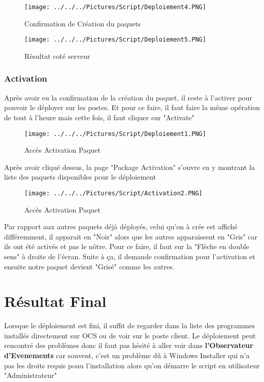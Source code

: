 \documentclass[11pt,a4paper,oneside]{article}
\begin{document}
\begin{figure}[hbtp]
\centering
\texttt{[image: ../../../Pictures/Script/Deploiement4.PNG]}
\caption{Confirmation de Création du paquets}
\end{figure}

\begin{figure}[hbtp]
\centering
\texttt{[image: ../../../Pictures/Script/Deploiement5.PNG]}
\caption{Résultat coté serveur}
\end{figure}
\newpage
\subsubsection{Activation}

Après avoir eu la confirmation de la création du paquet, il reste à l'activer pour pouvoir le déployer sur les postes. Et pour ce faire, il faut faire la même opération de tout à l'heure mais cette fois, il faut cliquer sur "Activate"

\begin{figure}[hbtp]
\centering
\texttt{[image: ../../../Pictures/Script/Deploiement1.PNG]}
\caption{Accès Activation Paquet}
\end{figure}

Après avoir cliqué dessus, la page "Package Activation" s'ouvre en y montrant la liste des paquets disponibles pour le déploiement

\begin{figure}[hbtp]
\centering
\texttt{[image: ../../../Pictures/Script/Activation2.PNG]}
\caption{Accès Activation Paquet}
\end{figure}
 
Par rapport aux autres paquets déjà déployés, celui qu'on à crée est affiché différemment, il apparait en "Noir" alors que les autres apparaissent en "Gris" car ils ont été activés et pas le nôtre. Pour ce faire, il faut sur la "Flèche en double sens" à droite de l'écran. Suite à ça, il demande confirmation pour l'activation et ensuite notre paquet devient "Grisé" comme les autres.
\newpage

\section{Résultat Final}
Lorsque le déploiement est fini, il suffit de regarder dans la liste des programmes installés directement sur OCS ou de voir sur le poste client. Le déploiement peut rencontré des problèmes donc il faut pas hésité à aller voir dans \textbf{l'Observateur d'Evenements} car souvent, c'est un problème dû à Windows Installer qui n'a pas les droits requis pouu l'installation alors qu'on démarre le script en utilisateur "Administrateur"
\end{document}
